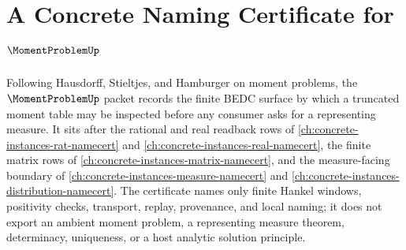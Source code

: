 \chapter{A Concrete Naming Certificate for $\MomentProblemUp$}
\label{ch:concrete-instances-moment-problem-namecert}

Following Hausdorff, Stieltjes, and Hamburger on moment problems, the $\MomentProblemUp$ packet records the finite BEDC surface by which a truncated moment table may be inspected before any consumer asks for a representing measure. It sits after the rational and real readback rows of \autoref{ch:concrete-instances-rat-namecert} and \autoref{ch:concrete-instances-real-namecert}, the finite matrix rows of \autoref{ch:concrete-instances-matrix-namecert}, and the measure-facing boundary of \autoref{ch:concrete-instances-measure-namecert} and \autoref{ch:concrete-instances-distribution-namecert}. The certificate names only finite Hankel windows, positivity checks, transport, replay, provenance, and local naming; it does not export an ambient moment problem, a representing measure theorem, determinacy, uniqueness, or a host analytic solution principle.

